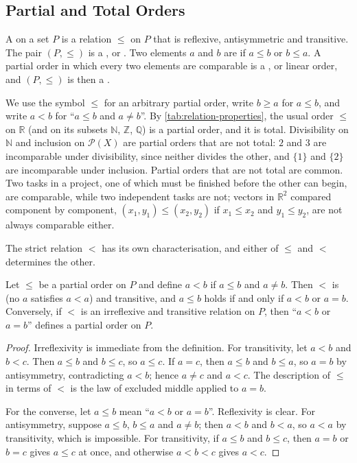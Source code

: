 \subsection{Partial and Total Orders}

\begin{definition}
\label{def:order}
A  on a set $P$ is a relation $\le$ on $P$ that is reflexive, antisymmetric and transitive. The pair $(P,\le)$ is a , or . Two elements $a$ and $b$ are  if $a\le b$ or $b\le a$. A partial order in which every two elements are comparable is a , or linear order, and $(P,\le)$ is then a .
\end{definition}

We use the symbol $\le$ for an arbitrary partial order, write $b\ge a$ for $a\le b$, and write $a<b$ for ``$a\le b$ and $a\ne b$''. By \cref{tab:relation-properties}, the usual order $\le$ on $\mathbb R$ (and on its subsets $\mathbb N$, $\mathbb Z$, $\mathbb Q$) is a partial order, and it is total. Divisibility on $\mathbb N$ and inclusion on $\mathcal P(X)$ are partial orders that are not total: $2$ and $3$ are incomparable under divisibility, since neither divides the other, and $\{1\}$ and $\{2\}$ are incomparable under inclusion. Partial orders that are not total are common. Two tasks in a project, one of which must be finished before the other can begin, are comparable, while two independent tasks are not; vectors in $\mathbb R^2$ compared component by component, $(x_1,y_1)\le(x_2,y_2)$ if $x_1\le x_2$ and $y_1\le y_2$, are not always comparable either.

The strict relation $<$ has its own characterisation, and either of $\le$ and $<$ determines the other.

\begin{proposition}
\label{prop:strict-order}
Let $\le$ be a partial order on $P$ and define $a<b$ if $a\le b$ and $a\ne b$. Then $<$ is  (no $a$ satisfies $a<a$) and transitive, and $a\le b$ holds if and only if $a<b$ or $a=b$. Conversely, if $<$ is an irreflexive and transitive relation on $P$, then ``$a<b$ or $a=b$'' defines a partial order on $P$.
\end{proposition}

\begin{proof}
Irreflexivity is immediate from the definition. For transitivity, let $a<b$ and $b<c$. Then $a\le b$ and $b\le c$, so $a\le c$. If $a=c$, then $a\le b$ and $b\le a$, so $a=b$ by antisymmetry, contradicting $a<b$; hence $a\ne c$ and $a<c$. The description of $\le$ in terms of $<$ is the law of excluded middle applied to $a=b$.

For the converse, let $a\le b$ mean ``$a<b$ or $a=b$''. Reflexivity is clear. For antisymmetry, suppose $a\le b$, $b\le a$ and $a\ne b$; then $a<b$ and $b<a$, so $a<a$ by transitivity, which is impossible. For transitivity, if $a\le b$ and $b\le c$, then $a=b$ or $b=c$ gives $a\le c$ at once, and otherwise $a<b<c$ gives $a<c$.
\end{proof}

